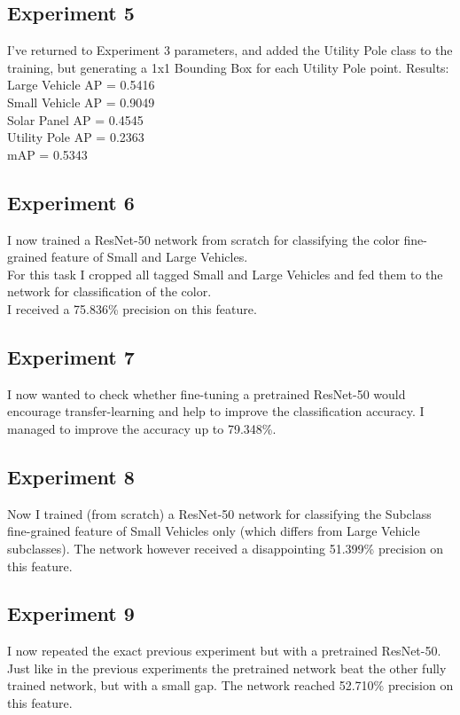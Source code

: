 \documentclass[]{article}
\begin{document}
\subsection{Experiment 5}
I've returned to Experiment 3 parameters, and added the Utility Pole class to the training, but generating a 1x1 Bounding Box for each Utility Pole point.
Results:\\
Large Vehicle AP = 0.5416\\
Small Vehicle AP = 0.9049\\
Solar Panel AP = 0.4545\\
Utility Pole AP = 0.2363\\
mAP = 0.5343

\subsection{Experiment 6}
I now trained a ResNet-50 \cite{resnet} network from scratch for classifying the color fine-grained feature of Small and Large Vehicles.\\
For this task I cropped all tagged Small and Large Vehicles and fed them to the network for classification of the color.\\
I received a 75.836\% precision on this feature.

\subsection{Experiment 7}
I now wanted to check whether fine-tuning a pretrained ResNet-50 \cite{resnet} would encourage transfer-learning and help to improve the classification accuracy.
I managed to improve the accuracy up to 79.348\%.

\subsection{Experiment 8}
Now I trained (from scratch) a ResNet-50 network for classifying the Subclass fine-grained feature of Small Vehicles only (which differs from Large Vehicle subclasses).
The network however received a disappointing 51.399\% precision on this feature.

\subsection{Experiment 9}
I now repeated the exact previous experiment but with a pretrained ResNet-50.\\
Just like in the previous experiments the pretrained network beat the other fully trained network, but with a small gap. The network reached 52.710\% precision on this feature.
\end{document}
